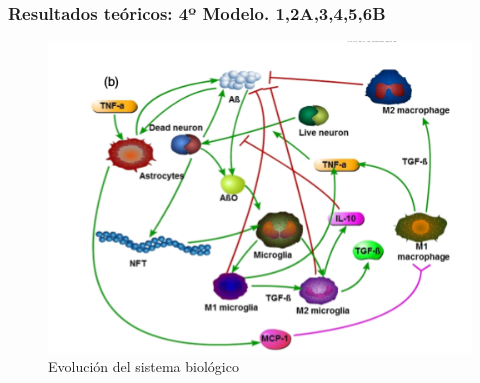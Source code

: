\documentclass{beamer}
\begin{document}
\begin{frame}
	\frametitle{Resultados teóricos: 4º Modelo. 1,2A,3,4,5,6B}
	\begin{figure}[Atrofia cerebral]
		\includegraphics[scale=0.4]{segundodiagrama.png}
		\caption{Evolución del sistema biológico}
		\label{cerebro4}
	\end{figure}
	
\end{frame}
\end{document}
